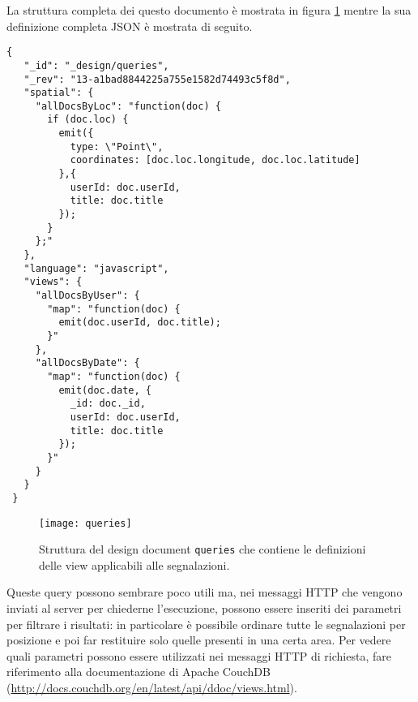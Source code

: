                 La struttura completa dei questo documento è mostrata in
                figura \ref{fig:queries} mentre la sua definizione completa
                JSON è mostrata di seguito.
                \begin{lstlisting}[language=plane]
 {
   "_id": "_design/queries",
   "_rev": "13-a1bad8844225a755e1582d74493c5f8d",
   "spatial": {
     "allDocsByLoc": "function(doc) {
       if (doc.loc) {
         emit({
           type: \"Point\",
           coordinates: [doc.loc.longitude, doc.loc.latitude]
         },{
           userId: doc.userId,
           title: doc.title
         });
       }
     };"
   },
   "language": "javascript",
   "views": {
     "allDocsByUser": {
       "map": "function(doc) {
         emit(doc.userId, doc.title);
       }"
     },
     "allDocsByDate": {
       "map": "function(doc) {
         emit(doc.date, {
           _id: doc._id,
           userId: doc.userId,
           title: doc.title
         });
       }"
     }
   }
 }
                \end{lstlisting}
                \begin{figure}[H]
                    \centering
                    \texttt{[image: queries]}
                    \caption{
                        Struttura del design document \texttt{queries} che
                        contiene le definizioni delle view applicabili alle
                        segnalazioni.
                    }
                    \label{fig:queries}
                \end{figure}
                Queste query possono sembrare poco utili ma, nei messaggi HTTP
                che vengono inviati al server per chiederne l'esecuzione,
                possono essere inseriti dei parametri per filtrare i risultati:
                in particolare è possibile ordinare tutte le segnalazioni per
                posizione e poi far restituire solo quelle presenti in una
                certa area. Per vedere quali parametri possono essere
                utilizzati nei messaggi HTTP di richiesta, fare riferimento
                alla documentazione di Apache CouchDB\texttrademark{}
                (\url{http://docs.couchdb.org/en/latest/api/ddoc/views.html}).

